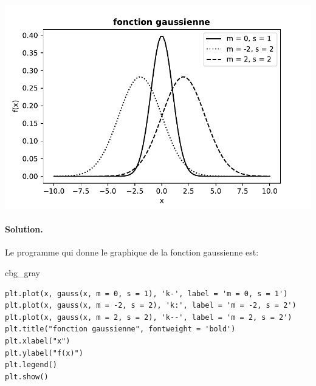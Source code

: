 \documentclass[%
oneside,                 %
final,                   %
10pt,french]{article}
\newenvironment{_cod_tight}[1]{
   \def\FrameCommand{\colorbox{#1}}
   \FrameRule0.6pt\MakeFramed {\FrameRestore}\vskip3mm}
   {\vskip0mm\endMakeFramed}
\newenvironment{cod}[1]{
\bgroup\rmfamily
\fboxsep=0mm\relax
\begin{_cod_tight}{#1}
\list{}{\parsep=-2mm\parskip=0mm\topsep=0pt\leftmargin=2mm
\rightmargin=2\leftmargin\leftmargin=4pt\relax}
\item\relax}
{\endlist\end{_cod_tight}\egroup}
\newenvironment{doconceexercise}{}{}
\begin{document}
\begin{doconceexercise}
\vspace{6mm}

\centerline{\includegraphics[width=0.7\linewidth]{imgs/gaussian.pdf}}

\vspace{6mm}




\paragraph{Solution.}
Le programme qui donne le graphique de la fonction gaussienne est:
\begin{cod}{cbg_gray}\begin{verbatim}
plt.plot(x, gauss(x, m = 0, s = 1), 'k-', label = 'm = 0, s = 1')
plt.plot(x, gauss(x, m = -2, s = 2), 'k:', label = 'm = -2, s = 2')
plt.plot(x, gauss(x, m = 2, s = 2), 'k--', label = 'm = 2, s = 2')
plt.title("fonction gaussienne", fontweight = 'bold')
plt.xlabel("x")
plt.ylabel("f(x)")
plt.legend()
plt.show()
\end{verbatim}
\end{cod}
\noindent


\end{doconceexercise}


\end{document}
